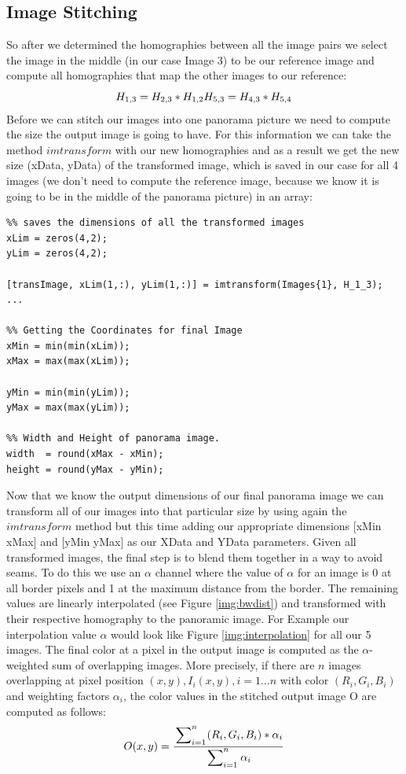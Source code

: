 \documentclass[subfigure,epsfig,fleqn,float,numbers=noenddot]{scrartcl}
\begin{document}
\subsection{Image Stitching}
\label{sec:C}
So after we determined the homographies between all the image pairs we select the image in the middle (in our case Image 3) to be our reference image and compute all homographies that map the other images to our reference:
\begin{equation*}
\\H_{1,3} = H_{2,3} * H_{1,2} \\
H_{5,3} = H_{4,3} * H_{5,4} 
\end{equation*}
Before we can stitch our images into one panorama picture we need to compute the size the output image is going to have. For this information we can take the method $imtransform$ with our new homographies and as a result we get the new size (xData, yData) of the transformed image, which is saved in our case for all 4 images (we don't need to compute the reference image, because we know it is going to be in the middle of the panorama picture) in an array: 
\begin{lstlisting}
%% saves the dimensions of all the transformed images
xLim = zeros(4,2);
yLim = zeros(4,2);
	
[transImage, xLim(1,:), yLim(1,:)] = imtransform(Images{1}, H_1_3);
...
	
%% Getting the Coordinates for final Image
xMin = min(min(xLim));
xMax = max(max(xLim));
   
yMin = min(min(yLim));
yMax = max(max(yLim));
   
%% Width and Height of panorama image.
width  = round(xMax - xMin);	
height = round(yMax - yMin);
\end{lstlisting}

Now that we know the output dimensions of our final panorama image we can transform all of our images into that particular size by using again the $imtransform$ method but this time adding our appropriate dimensions [xMin xMax] and [yMin yMax] as our XData and YData parameters. Given all transformed images, the final step is to blend them together in a way to avoid seams. To do this we use an $\alpha$ channel where the value of $\alpha$ for an image is 0 at all border pixels and 1 at the maximum distance from the border. The remaining values are linearly interpolated (see Figure \ref{img:bwdist}) and transformed with their respective homography to the panoramic image. For Example our interpolation value $\alpha$ would look like Figure \ref{img:interpolation} for all our 5 images. The final color at a pixel in the output image is computed as the $\alpha$-weighted sum of overlapping images. More precisely, if there are $n$ images overlapping at pixel position $(x,y), I_i(x,y), i = 1...n$ with color $(R_i,G_i,B_i)$ and weighting factors $\alpha_i$, the color values in the stitched output image O are computed as follows:
\begin{equation*}
	O(x,y) = \frac{\sideset{}{_{i=1}^n}\sum_{} (R_i,G_i,B_i) * \alpha_i} {\sideset{}{_{i=1}^n}\sum_{} \alpha_i}
\end{equation*}
\end{document}
